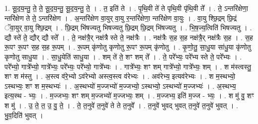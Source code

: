 \documentclass[17pt]{extarticle}
\begin{document}
1. सू॒द॒य॒न्तु॒ ते॒ ते॒ सू॒द॒य॒न्तु॒ सू॒द॒य॒न्तु॒ ते॒ । . त॒ इति॑ ते । . पृ॒थि॒वी ते॑ ते पृथि॒वी पृ॑थि॒वी ते᳚ । . ते॒ ऽन्तरि॑क्षेणा॒ न्तरि॑क्षेण ते ते॒ ऽन्तरि॑क्षेण । . अ॒न्तरि॑क्षेण वा॒युर् वा॒यु र॒न्तरि॑क्षेणा॒ न्तरि॑क्षेण वा॒युः । . वा॒यु श्छि॒द्रम् छि॒द्रं ॅवा॒युर् वा॒यु श्छि॒द्रम् । . छि॒द्रम् भि॑षज्यतु भिषज्यतु छि॒द्रम् छि॒द्रम् भि॑षज्यतु । . भि॒ष॒ज्य॒त्विति॑ भिषज्यतु । . द्यौ स्ते॑ ते॒ द्यौर् द्यौ स्ते᳚ । . ते॒ नक्ष॑त्रै॒र् नक्ष॑त्रै स्ते ते॒ नक्ष॑त्रैः । . नक्ष॑त्रैः स॒ह स॒ह नक्ष॑त्रै॒र् नक्ष॑त्रैः स॒ह । . स॒ह रू॒पꣳ रू॒पꣳ स॒ह स॒ह रू॒पम् । . रू॒पम् कृ॑णोतु कृणोतु रू॒पꣳ रू॒पम् कृ॑णोतु । . कृ॒णो॒तु॒ सा॒धु॒या सा॑धु॒या कृ॑णोतु कृणोतु साधु॒या । . सा॒धु॒येति॑ साधु॒या । . शम् ते॑ ते॒ शꣳ शम् ते᳚ । . ते॒ परे᳚भ्यः॒ परे᳚भ्य स्ते ते॒ परे᳚भ्यः । . परे᳚भ्यो॒ गात्रे᳚भ्यो॒ गात्रे᳚भ्यः॒ परे᳚भ्यः॒ परे᳚भ्यो॒ गात्रे᳚भ्यः । . गात्रे᳚भ्यः॒ शꣳ शम् गात्रे᳚भ्यो॒ गात्रे᳚भ्यः॒ शम् । . श म॑स्त्वस्तु॒ शꣳ श म॑स्तु । . अ॒स्त्व व॑रे॒भ्यो ऽव॑रेभ्यो अस्त्व॒स्त्व व॑रेभ्यः । . अव॑रेभ्य॒ इत्यव॑रेभ्यः । . श म॒स्थभ्यो॒ ऽस्थभ्यः॒ शꣳ श म॒स्थभ्यः॑ । . अ॒स्थभ्यो॑ म॒ज्जभ्यो॑ म॒ज्जभ्यो॒ ऽस्थभ्यो॒ ऽस्थभ्यो॑ म॒ज्जभ्यः॑ । . अ॒स्थभ्य॒ इत्य॒स्थ - भ्यः॒ । . म॒ज्जभ्यः॒ शꣳ शम् म॒ज्जभ्यो॑ म॒ज्जभ्यः॒ शम् । . म॒ज्जभ्य॒ इति॑ म॒ज्ज - भ्यः॒ । . श मु॑ वु॒ शꣳ श मु॑ । . उ॒ ते॒ त॒ उ॒ वु॒ ते॒ । . ते॒ त॒नुवे॑ त॒नुवे॑ ते ते त॒नुवे᳚ । . त॒नुवे॑ भुवद् भुवत् त॒नुवे॑ त॒नुवे॑ भुवत् । . भु॒व॒दिति॑ भुवत् । \newline
\end{document}
